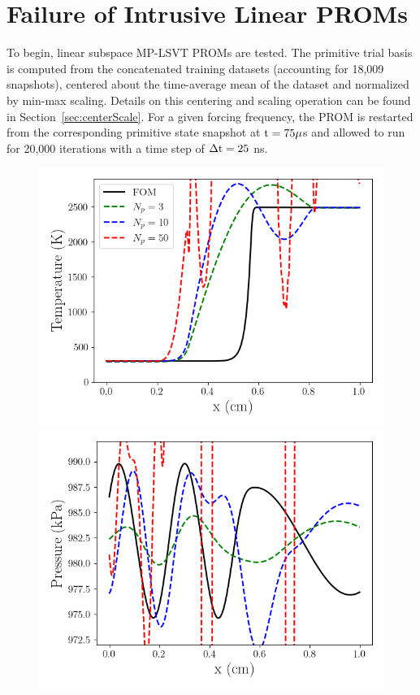 \section{Failure of Intrusive Linear PROMs}\label{sec:flameLinear}

To begin, linear subspace MP-LSVT PROMs are tested. The primitive trial basis is computed from the concatenated training datasets (accounting for 18,009 snapshots), centered about the time-average mean of the dataset and normalized by min-max scaling. Details on this centering and scaling operation can be found in Section~\ref{sec:centerScale}. For a given forcing frequency, the PROM is restarted from the corresponding primitive state snapshot at $\text{t} = 75 \mu$s and allowed to run for 20,000 iterations with a time step of $\Delta \text{t} = 25$ ns.

\begin{figure}
    \begin{minipage}{0.49\linewidth}
        \includegraphics[width=0.99\linewidth]{Chapters/TransientFlame/Images/linear/rom_temp_snaps.png}
    \end{minipage}
    \begin{minipage}{0.49\linewidth}
        \includegraphics[width=0.99\linewidth]{Chapters/TransientFlame/Images/linear/rom_press_snaps.png}

\end{minipage}
\end{figure}
